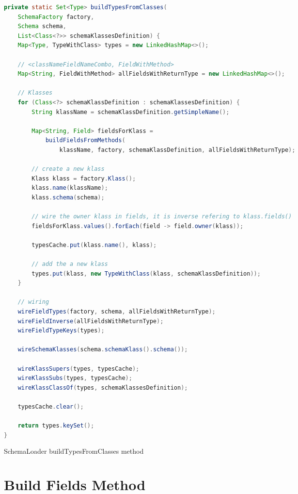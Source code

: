\begin{sourcecode} [H]
	\begin{lstlisting}[language=Java, escapechar=|]
private static Set<Type> buildTypesFromClasses(
	SchemaFactory factory,
	Schema schema,
	List<Class<?>> schemaKlassesDefinition) {
	Map<Type, TypeWithClass> types = new LinkedHashMap<>();

	// <classNameFieldNameCombo, FieldWithMethod>
	Map<String, FieldWithMethod> allFieldsWithReturnType = new LinkedHashMap<>();

	// Klasses
	for (Class<?> schemaKlassDefinition : schemaKlassesDefinition) {
		String klassName = schemaKlassDefinition.getSimpleName();

		Map<String, Field> fieldsForKlass =
			buildFieldsFromMethods(
				klassName, factory, schemaKlassDefinition, allFieldsWithReturnType);

		// create a new klass
		Klass klass = factory.Klass();
		klass.name(klassName);
		klass.schema(schema);

		// wire the owner klass in fields, it is inverse refering to klass.fields()
		fieldsForKlass.values().forEach(field -> field.owner(klass));

		typesCache.put(klass.name(), klass);

		// add the a new klass
		types.put(klass, new TypeWithClass(klass, schemaKlassDefinition));
	}

	// wiring
	wireFieldTypes(factory, schema, allFieldsWithReturnType);
	wireFieldInverse(allFieldsWithReturnType);
	wireFieldTypeKeys(types);

	wireSchemaKlasses(schema.schemaKlass().schema());

	wireKlassSupers(types, typesCache);
	wireKlassSubs(types, typesCache);
	wireKlassClassOf(types, schemaKlassesDefinition);

	typesCache.clear();

	return types.keySet();
}
    \end{lstlisting}
	\caption{SchemaLoader buildTypesFromClasses method}
	\label{lst:SchemaLoader_buildTypesFromClasses}
\end{sourcecode}

\section{Build Fields Method}

